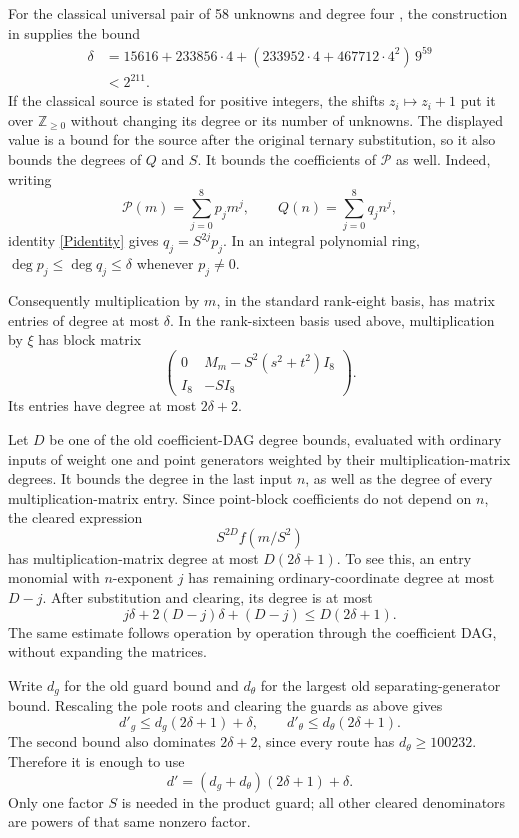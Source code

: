 \documentclass[11pt]{article}
\newcommand{\N}{\mathbb Z_{\ge0}}\newcommand{\A}{\mathcal A}
\begin{document}
For the classical universal pair of 58 unknowns and degree
four \cite{Jones}, the construction in \cite[Theorem A and Section 6.1]{BDHMS}
supplies the bound
\begin{equation}\label{delta}
 \begin{split}
 \delta&=15616+233856\cdot4
       +(233952\cdot4+467712\cdot4^2)\,9^{59}\\
 &<2^{211}.
 \end{split}
\end{equation}
If the classical source is stated for positive integers, the shifts
\(z_i\mapsto z_i+1\) put it over \(\N\) without changing its degree
or its number of unknowns.  The displayed value is a bound for the source
after the original ternary substitution,
so it also bounds the degrees of \(Q\) and \(S\).  It bounds the
coefficients of \(\mathcal P\) as well.  Indeed, writing
\[
 \mathcal P(m)=\sum_{j=0}^{8}p_jm^j,\qquad
 Q(n)=\sum_{j=0}^{8}q_jn^j,
\]
identity \eqref{Pidentity} gives
\(q_j=S^{2j}p_j\).  In an integral polynomial ring,
\(\deg p_j\le\deg q_j\le\delta\) whenever \(p_j\ne0\).

Consequently multiplication by \(m\), in the standard rank-eight
basis, has matrix entries of degree at most \(\delta\).
In the rank-sixteen basis used above, multiplication by \(\xi\) has
block matrix
\[
 \begin{pmatrix}
 0&M_m-S^2(s^2+t^2)I_8\\
 I_8&-SI_8
 \end{pmatrix}.
\]
Its entries have degree at most \(2\delta+2\).

Let \(D\) be one of the old coefficient-DAG degree bounds, evaluated
with ordinary inputs of weight one and point generators weighted by
their multiplication-matrix degrees.  It bounds the degree in the last
input \(n\), as well as the degree of every multiplication-matrix
entry.  Since point-block coefficients do not depend on \(n\), the
cleared expression
\[
                              S^{2D}f(m/S^2)
\]
has multiplication-matrix degree at most \(D(2\delta+1)\).
To see this, an entry monomial with \(n\)-exponent \(j\) has remaining
ordinary-coordinate degree at most \(D-j\).  After substitution and
clearing, its degree is at most
\[
 j\delta+2(D-j)\delta+(D-j)\le D(2\delta+1).
\]
The same estimate follows operation by operation through the
coefficient DAG, without expanding the matrices.

Write \(d_g\) for the old guard bound and \(d_\theta\) for the largest
old separating-generator bound.  Rescaling the pole roots and clearing
the guards as above gives
\[
 d'_g\le d_g(2\delta+1)+\delta,\qquad
 d'_\theta\le d_\theta(2\delta+1).
\]
The second bound also dominates \(2\delta+2\), since every route has
\(d_\theta\ge100232\).  Therefore it is enough to use
\begin{equation}\label{newd}
                      d'=(d_g+d_\theta)(2\delta+1)+\delta.
\end{equation}
Only one factor \(S\) is needed in the product guard; all other cleared
denominators are powers of that same nonzero factor.
\end{document}

